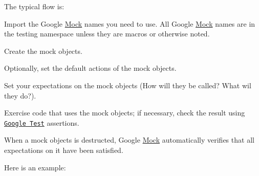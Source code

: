 The typical flow is\+:
\begin{DoxyEnumerate}
\item Import the Google \hyperlink{classMock}{Mock} names you need to use. All Google \hyperlink{classMock}{Mock} names are in the {\ttfamily testing} namespace unless they are macros or otherwise noted.
\end{DoxyEnumerate}
\begin{DoxyEnumerate}
\item Create the mock objects.
\end{DoxyEnumerate}
\begin{DoxyEnumerate}
\item Optionally, set the default actions of the mock objects.
\end{DoxyEnumerate}
\begin{DoxyEnumerate}
\item Set your expectations on the mock objects (How will they be called? What wil they do?).
\end{DoxyEnumerate}
\begin{DoxyEnumerate}
\item Exercise code that uses the mock objects; if necessary, check the result using \href{../../googletest/}{\tt Google Test} assertions.
\end{DoxyEnumerate}
\begin{DoxyEnumerate}
\item When a mock objects is destructed, Google \hyperlink{classMock}{Mock} automatically verifies that all expectations on it have been satisfied.
\end{DoxyEnumerate}

Here is an example\+: 


